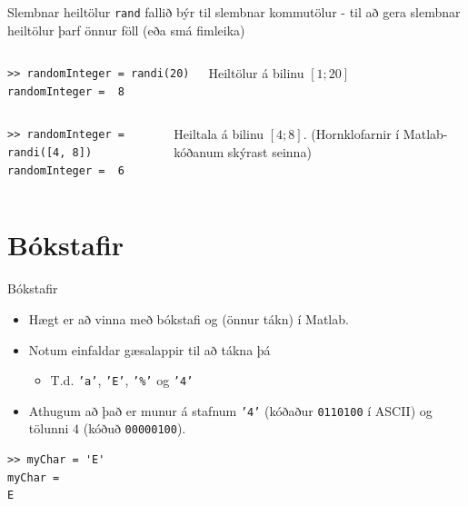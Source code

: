 \documentclass{beamer}
\begin{document}
\begin{frame}[fragile]{Slembnar heiltölur}
\texttt{rand} fallið býr til slembnar kommutölur - til að gera slembnar heiltölur þarf önnur föll (eða smá fimleika)
\begin{columns}
\begin{verbatim}
>> randomInteger = randi(20)
randomInteger =  8
\end{verbatim}
Heiltölur á bilinu $[1;20]$
\end{columns}

\begin{columns}
\begin{verbatim}
>> randomInteger = randi([4, 8])
randomInteger =  6
\end{verbatim}
Heiltala á bilinu $[4; 8]$. (Hornklofarnir í Matlab-kóðanum skýrast seinna)
\end{columns}
\end{frame}

\section{Bókstafir}

\begin{frame}[fragile]{Bókstafir}
\begin{itemize}
 \item Hægt er að vinna með bókstafi og (önnur tákn) í Matlab.
 \item Notum einfaldar gæsalappir til að tákna þá
 \begin{itemize}
  \item T.d. \texttt{'a'}, \texttt{'E'}, \texttt{'\%'} og \texttt{'4'}
 \end{itemize}
 \item Athugum að það er munur á stafnum \texttt{'4'} (kóðaður \texttt{0110100} í ASCII) og tölunni $4$ (kóðuð \texttt{00000100}).
\end{itemize}
\begin{verbatim}
>> myChar = 'E'
myChar =
E
\end{verbatim}
\end{frame}
\end{document}
